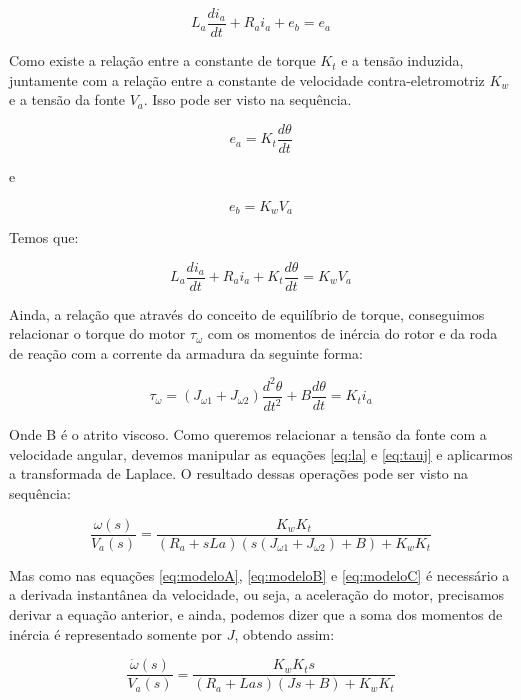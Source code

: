 \begin{equation}
L_a \frac{di_a}{dt}+R_a i_a + e_b = e_a
\end{equation}

Como existe a relação entre a constante de torque $K_t$ e a tensão induzida, juntamente com a relação entre a constante de velocidade contra-eletromotriz $K_w$ e a tensão da fonte $V_a$. Isso pode ser visto na sequência.

\begin{equation}
  e_a = K_t\frac{d\theta}{dt}
\end{equation}

e

\begin{equation}
  e_b = K_wV_a
\end{equation}

Temos que:

\begin{equation}\label{eq:la}
L_a \frac{di_a}{dt}+R_a i_a + K_t\frac{d\theta}{dt} = K_wV_a
\end{equation}

Ainda, a relação que através do conceito de equilíbrio de torque, conseguimos relacionar o torque do motor $\tau_{\omega}$ com os momentos de inércia do rotor e da roda de reação com a corrente da armadura da seguinte forma:

\begin{equation}\label{eq:tauj}
\tau_{\omega} = (J_{\omega 1} + J_{\omega 2})\frac{d^{2}\theta}{dt^{2}}+B\frac{d\theta}{dt} = K_t i_a
\end{equation}

Onde B é o atrito viscoso. Como queremos relacionar a tensão da fonte com a velocidade angular, devemos manipular as equações \ref{eq:la} e \ref{eq:tauj} e aplicarmos a transformada de Laplace. O resultado dessas operações pode ser visto na sequência: 

\begin{equation}
  \frac{\omega(s)}{V_a(s)} = \frac{K_wK_t}{(R_a+ sLa)(s(J_{\omega 1} + J_{\omega 2})+B)+K_wK_t}  
\end{equation}

Mas como nas equações \ref{eq:modeloA}, \ref{eq:modeloB} e \ref{eq:modeloC} é necessário a a derivada instantânea da velocidade, ou seja, a aceleração do motor, precisamos derivar a equação anterior, e ainda, podemos dizer que a soma dos momentos de inércia é representado somente por $J$, obtendo assim:

\begin{equation}\label{eq:motor_accel}
  \frac{\dot{\omega}(s)}{V_a(s)} = \frac{K_wK_t s}{(R_a+ Las)(Js+B)+K_wK_t}  
\end{equation}

